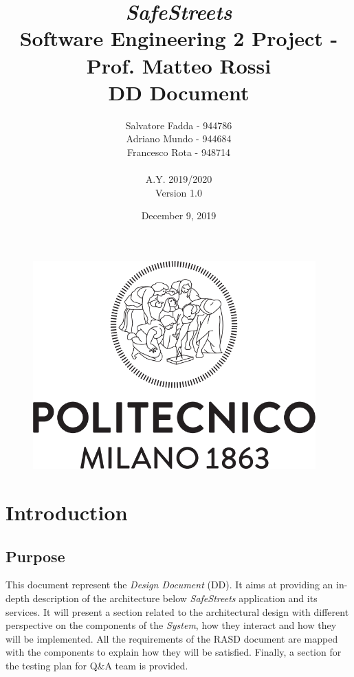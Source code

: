 \documentclass{article}
\begin{document}
\begin{figure}
\centering
	\includegraphics[height=8cm]{Images/polimi_logo}
\end{figure}
	
\title {{\Huge \it SafeStreets} \\ \Large Software Engineering 2 Project - Prof. Matteo Rossi \\ {\bf DD Document}}
\author{Salvatore Fadda - 944786\\Adriano Mundo - 944684 \\ Francesco Rota - 948714
		\\ \\ A.Y. 2019/2020 \\ Version 1.0}
\date{December 9, 2019}	

\maketitle
\newpage

\tableofcontents
\newpage

\section{Introduction}
	\subsection{Purpose}
	This document represent the {\it Design Document} (DD). It aims at providing an in-depth description of the architecture below {\it SafeStreets} application and its services. It will present a section related to the architectural design with different perspective on the components of the {\it System}, how they interact and how they will be implemented. All the requirements of the RASD document are mapped with the components to explain how they will be satisfied. Finally, a section for the testing plan for Q\&A team is provided.
		
\end{document}
